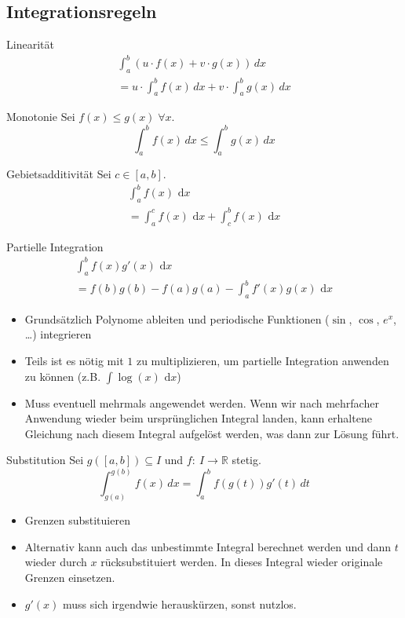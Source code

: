 \documentclass[a4paper,10pt]{article}
\def\R{\mathbb{R}}
\def\dx{\text{ d}x}
\begin{document}
\subsection{Integrationsregeln}
\begin{subbox}{Linearität}
 \vspace{-12pt}
 \begin{multline*}
     \int_a^b (u \cdot f(x) + v \cdot g(x)) \, dx \\
     = u \cdot \int_a^b f(x) \, dx + v \cdot \int_a^b g(x) \, dx
 \end{multline*}
\end{subbox}
\begin{subbox}{Monotonie}
Sei $f(x) \leq g(x) \; \forall x$.
\[ \int_a^b f(x) \, dx \leq \int_a^b g(x) \, dx \]
\end{subbox}
\begin{subbox}{Gebietsadditivität}
 Sei $c \in [a, b]$.
 \begin{multline*}
     \int_a^b f(x) \dx \\
     = \int_a^c f(x) \dx + \int_c^b f(x) \dx
 \end{multline*}
\end{subbox}
\begin{mainbox}{Partielle Integration}
 \vspace{-12pt}
 \begin{multline*}
     \int_a^b f(x)g'(x) \dx \\
     = f(b)g(b) - f(a)g(a) - \int_a^b f'(x)g(x) \dx
 \end{multline*}
\end{mainbox}
\begin{itemize}
 \item Grundsätzlich Polynome ableiten und periodische Funktionen ($\sin$, $\cos$, $e^x$, \dots) integrieren
 \item Teils ist es nötig mit $1$ zu multiplizieren, um partielle Integration anwenden zu können (z.B. $\int \log(x) \dx$)
 \item Muss eventuell mehrmals angewendet werden. Wenn wir nach mehrfacher Anwendung wieder beim ursprünglichen Integral landen, kann erhaltene Gleichung nach diesem Integral aufgelöst werden, was dann zur Lösung führt.
\end{itemize}
\begin{mainbox}{Substitution}
 Sei $g(\left[ a, b \right]) \subseteq I$ und $f: \: I \to \R$ stetig.
 \[ \int_{g(a)}^{g(b)} f(x) \, dx = \int_a^b f(g(t)) g'(t) \, dt \]
\end{mainbox}
\begin{itemize}
 \item Grenzen substituieren
 \item Alternativ kann auch das unbestimmte Integral berechnet werden und dann $t$ wieder durch $x$ rücksubstituiert werden. In dieses Integral wieder originale Grenzen einsetzen.
 \item $g'(x)$ muss sich irgendwie herauskürzen, sonst nutzlos.
\end{itemize}
\end{document}
